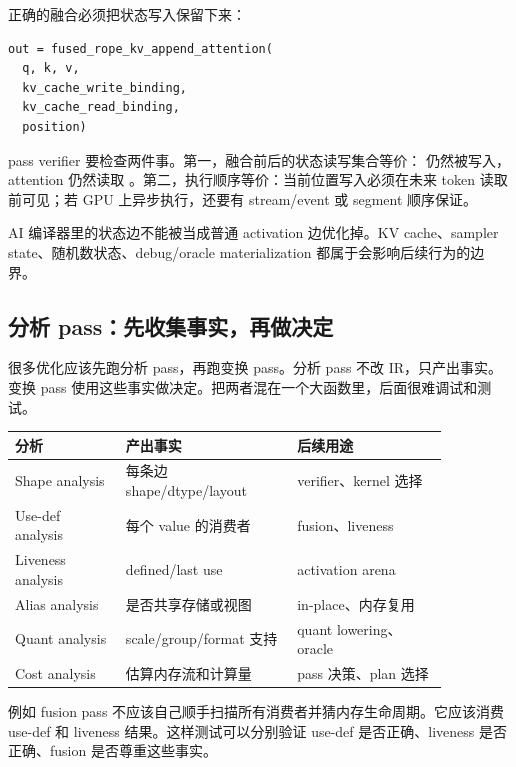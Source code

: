 正确的融合必须把状态写入保留下来：

\begin{lstlisting}[numbers=none,caption={正确融合必须保留 state write}]
out = fused_rope_kv_append_attention(
  q, k, v,
  kv_cache_write_binding,
  kv_cache_read_binding,
  position)
\end{lstlisting}

pass verifier 要检查两件事。第一，融合前后的状态读写集合等价： 仍然被写入，attention 仍然读取 。第二，执行顺序等价：当前位置写入必须在未来 token 读取前可见；若 GPU 上异步执行，还要有 stream/event 或 segment 顺序保证。

\begin{warningbox}
AI 编译器里的状态边不能被当成普通 activation 边优化掉。KV cache、sampler state、随机数状态、debug/oracle materialization 都属于会影响后续行为的边界。
\end{warningbox}

\subsection{分析 pass：先收集事实，再做决定}

很多优化应该先跑分析 pass，再跑变换 pass。分析 pass 不改 IR，只产出事实。变换 pass 使用这些事实做决定。把两者混在一个大函数里，后面很难调试和测试。

\begin{center}
\begin{tabular}{p{0.22\linewidth}p{0.34\linewidth}p{0.30\linewidth}}
\toprule
分析 & 产出事实 & 后续用途 \\
\midrule
Shape analysis & 每条边 shape/dtype/layout & verifier、kernel 选择 \\
Use-def analysis & 每个 value 的消费者 & fusion、liveness \\
Liveness analysis & defined/last use & activation arena \\
Alias analysis & 是否共享存储或视图 & in-place、内存复用 \\
Quant analysis & scale/group/format 支持 & quant lowering、oracle \\
Cost analysis & 估算内存流和计算量 & pass 决策、plan 选择 \\
\bottomrule
\end{tabular}
\end{center}

例如 fusion pass 不应该自己顺手扫描所有消费者并猜内存生命周期。它应该消费 use-def 和 liveness 结果。这样测试可以分别验证 use-def 是否正确、liveness 是否正确、fusion 是否尊重这些事实。

